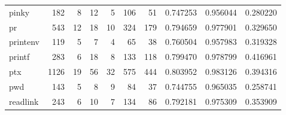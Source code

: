 \begin{longtable}{lrrrrrrrrr}
pinky     &                    182 &                                  8 &                                12 &                                5 &                               106 &                              51 &                                0.747253 &                               0.956044 &                             0.280220 \\
pr        &                    543 &                                 12 &                                18 &                               10 &                               324 &                             179 &                                0.794659 &                               0.977901 &                             0.329650 \\
printenv  &                    119 &                                  5 &                                 7 &                                4 &                                65 &                              38 &                                0.760504 &                               0.957983 &                             0.319328 \\
printf    &                    283 &                                  6 &                                18 &                                8 &                               133 &                             118 &                                0.799470 &                               0.978799 &                             0.416961 \\
ptx       &                   1126 &                                 19 &                                56 &                               32 &                               575 &                             444 &                                0.803952 &                               0.983126 &                             0.394316 \\
pwd       &                    143 &                                  5 &                                 8 &                                9 &                                84 &                              37 &                                0.744755 &                               0.965035 &                             0.258741 \\
readlink  &                    243 &                                  6 &                                10 &                                7 &                               134 &                              86 &                                0.792181 &                               0.975309 &                             0.353909 \\

\end{longtable}
